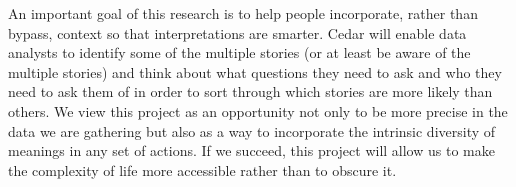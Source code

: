 An important goal of this research is to help people
incorporate, rather than bypass, context so that interpretations are
smarter.  Cedar will enable data analysts to identify some of the multiple
stories (or at least be aware of the multiple stories) and think about what
questions they need to ask and who they need to ask them of in order to
sort through which stories are more likely than others.  We view this
project as an opportunity not only to be more precise in the data we are
gathering but also as a way to incorporate the intrinsic diversity of
meanings in any set of actions.  If we succeed, this project will allow us
to make the complexity of life more accessible rather than to obscure it.


